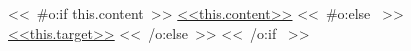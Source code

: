 <<~#o:if this.content~>>
  \href{<<this.target>>}{<<this.content>>}
  <<~#o:else ~>>
    \url{<<this.target>>}
  <<~/o:else~>>
<<~/o:if ~>>
